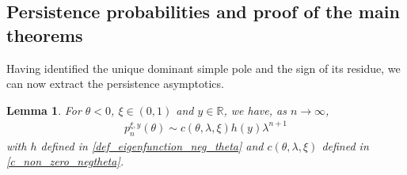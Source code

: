 \documentclass[10pt,a4paper]{amsart}
\newcommand{\R}{\mathbb{R}} %
\newcommand{\1}{\mathds{1}}
\newtheorem{Lemma}[definition]{Lemma}
\begin{document}
\subsection{Persistence probabilities and proof of the main theorems}
Having identified the unique dominant simple pole and the sign of its residue, we can now extract the persistence asymptotics.
\begin{Lemma}\label{asymptotic_neg_theta}
  For $\theta<0$,  $\xi\in(0,1)$ and $y\in\R$, we have, as $n\to\infty$,
  \begin{align*}
       p_n^{\xi,y}(\theta)\sim c(\theta,\lambda,\xi)h(y)\lambda^{n+1}
  \end{align*}
  with $h$ defined in \eqref{def_eigenfunction_neg_theta} and $c(\theta,\lambda,\xi)$ defined in \eqref{c_non_zero_negtheta}.
\end{Lemma}
\end{document}
